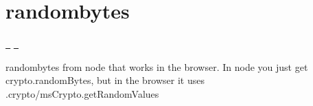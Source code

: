 \chapter{randombytes}
\hypertarget{md_node__modules_2randombytes_2README}{}\label{md_node__modules_2randombytes_2README}
\href{https://www.npmjs.org/package/randombytes}{\texttt{ }} \href{https://travis-ci.org/crypto-browserify/randombytes}{\texttt{ }}

randombytes from node that works in the browser. In node you just get crypto.\+random\+Bytes, but in the browser it uses .crypto/ms\+Crypto.\+get\+Random\+Values


\begin{DoxyCode}{0}
\DoxyCodeLine{\});}

\end{DoxyCode}
 